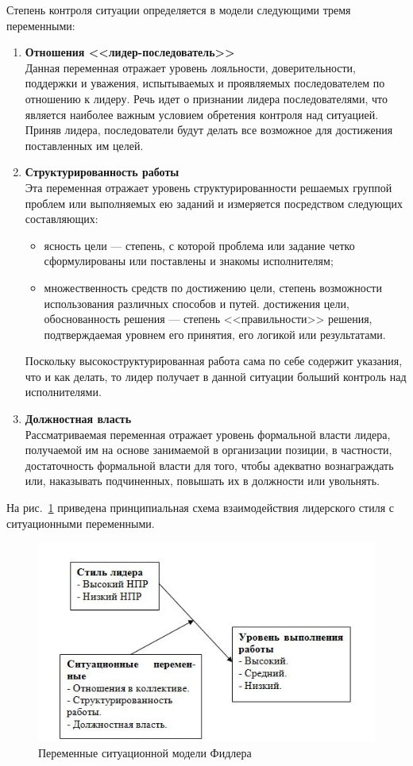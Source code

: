 \documentclass[a4paper,12pt,oneside,final]{extarticle}
\makeatletter
\numberwithin{equation}{section}
\def\maxwidth#1{\ifdim\Gin@nat@width>#1 #1\else\Gin@nat@width\fi}
\makeatother
\begin{document}
Степень контроля ситуации определяется в модели следующими тремя переменными:
\begin{enumerate}
	\item \textbf{Отношения <<лидер-последователь>>} \\
	Данная переменная отражает уровень лояльности, доверительности, поддержки и уважения, испытываемых и проявляемых последователем по отношению к лидеру.
	Речь идет о признании лидера последователями, что является наиболее важным условием обретения контроля над ситуацией. 
	Приняв лидера, последователи будут делать все возможное для достижения поставленных им целей.
	\item \textbf{Структурированность работы} \\
	Эта переменная отражает уровень структурированности решаемых группой проблем или выполняемых ею заданий и измеряется посредством следующих составляющих:
	\begin{itemize}
		\item ясность цели --- степень, с которой проблема или задание четко сформулированы или поставлены и знакомы исполнителям;
		\item множественность средств по достижению цели, степень возможности использования различных способов и путей. достижения цели, обоснованность решения --- степень <<правильности>> решения, подтверждаемая уровнем его принятия, его логикой или результатами.
	\end{itemize}
	Поскольку высокоструктурированная работа сама по себе содержит указания, что и как делать, то лидер получает в данной ситуации больший контроль над исполнителями.
	\item \textbf{Должностная власть} \\
	Рассматриваемая переменная отражает уровень формальной власти лидера, получаемой им на основе занимаемой в организации позиции, в частности, достаточность формальной власти для того, чтобы адекватно вознаграждать или, наказывать подчиненных, повышать их в должности или увольнять.
\end{enumerate}

На рис.~\ref{leadership_fd_var} приведена принципиальная схема взаимодействия лидерского стиля с ситуационными переменными.

\begin{figure}[h]
	\centering
	\includegraphics[width=\maxwidth{\textwidth}]{management-figures/leadership_fd_var}
	\caption{Переменные ситуационной модели Фидлера}
	\label{leadership_fd_var}
\end{figure}
\end{document}

